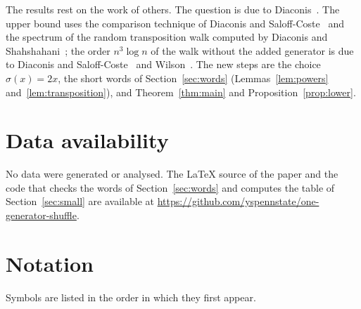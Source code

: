 \documentclass[11pt]{amsart}
\theoremstyle{remark}
\numberwithin{equation}{section}
\begin{document}
The results rest on the work of others. The question is due to Diaconis~\cite[Question~3]{Diaconis13}. The upper bound uses the comparison technique of Diaconis and Saloff-Coste~\cite{DSC} and the spectrum of the random transposition walk computed by Diaconis and Shahshahani~\cite{DS81}; the order $n^3\log n$ of the walk without the added generator is due to Diaconis and Saloff-Coste~\cite{DSC} and Wilson~\cite{Wilson}. The new steps are the choice $\sigma(x)=2x$, the short words of Section~\ref{sec:words} (Lemmas~\ref{lem:powers} and~\ref{lem:transposition}), and Theorem~\ref{thm:main} and Proposition~\ref{prop:lower}.

\section*{Data availability}
No data were generated or analysed. The \LaTeX{} source of the paper and the code that checks the words of Section~\ref{sec:words} and computes the table of Section~\ref{sec:small} are available at \url{https://github.com/yspennstate/one-generator-shuffle}.

\appendix
\section{Notation}\label{app:notation}
Symbols are listed in the order in which they first appear.
\end{document}
